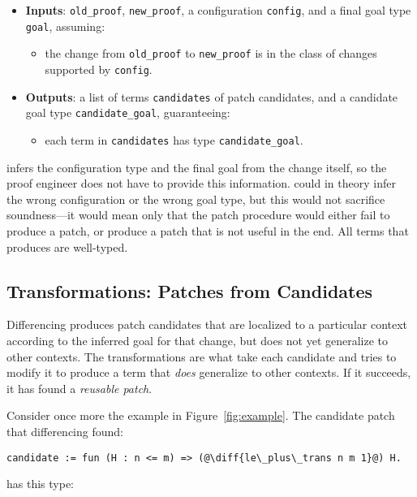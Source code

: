 \begin{itemize}
\item \textbf{Inputs}: \lstinline{old_proof}, \lstinline{new_proof}, a configuration \lstinline{config}, and a final goal type \lstinline{goal}, assuming:
\begin{itemize}
\item the change from \lstinline{old_proof} to \lstinline{new_proof} is in the class of changes supported by \lstinline{config}.
\end{itemize}
\item \textbf{Outputs}: a list of terms \lstinline{candidates} of patch candidates, and a candidate goal type \lstinline{candidate_goal}, guaranteeing:
\begin{itemize}
\item each term in \lstinline{candidates} has type \lstinline{candidate_goal}.
\end{itemize}
\end{itemize}
\sysname infers the configuration type and the final goal from the change itself, so the proof engineer does not have to provide this information.
\sysname could in theory infer the wrong configuration or the wrong goal type, but this would not sacrifice soundness---it would mean only that
the patch procedure would either fail to produce a patch, or produce a patch that is not useful in the end.
All terms that \sysname produces are well-typed. %

\subsection{Transformations: Patches from Candidates}
\label{sec:pumpkin-spec-trans}

Differencing produces patch candidates that are localized to a particular context according to the inferred goal for that change,
but does not yet generalize to other contexts.
The transformations are what take each candidate and tries to modify it to produce a term that \textit{does} generalize to other contexts.
If it succeeds, it has found a \textit{reusable patch}.

Consider once more the example in Figure~\ref{fig:example}.
The candidate patch that differencing found:

\begin{lstlisting}[language=coq]
  candidate := fun (H : n <= m) => (@\diff{le\_plus\_trans n m 1}@) H.
\end{lstlisting}
has this type:

